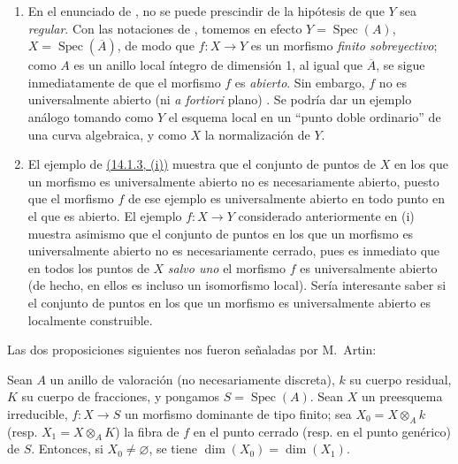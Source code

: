 \begin{remarks}[14.3.9]
\label{IV.14.3.9}
\begin{enumerate}[label=(\roman*)]
  \item En el enunciado de , no se puede prescindir de la hipótesis de que $Y$ sea \emph{regular}.
  Con las notaciones de , tomemos en efecto $Y=\operatorname{Spec}(A)$, $X=\operatorname{Spec}(\overline A)$, de modo que $f:X\to Y$ es un morfismo \emph{finito sobreyectivo}; como $A$ es un anillo local íntegro de dimensión 1, al igual que $\overline A$, se sigue inmediatamente de  que el morfismo $f$ es \emph{abierto}.
  Sin embargo, $f$ no es universalmente abierto (ni \emph{a fortiori} plano) .
  Se podría dar un ejemplo análogo tomando como $Y$ el esquema local en un ``punto doble ordinario'' de una curva algebraica, y como $X$ la normalización de $Y$.

  \item El ejemplo de {\hyperlink{ega4.c04.item.14-1-3}{(14.1.3, (i))}} muestra que el conjunto de puntos de $X$ en los que un morfismo es universalmente abierto no es necesariamente abierto, puesto que el morfismo $f$ de ese ejemplo es universalmente abierto en todo punto en el que es abierto.
  El ejemplo $f:X\to Y$ considerado anteriormente en (i) muestra asimismo que el conjunto de puntos en los que un morfismo es universalmente abierto no es necesariamente cerrado, pues es inmediato que en todos los puntos de $X$ \emph{salvo uno} el morfismo $f$ es universalmente abierto (de hecho, en ellos es incluso un isomorfismo local).
  Sería interesante saber si el conjunto de puntos en los que un morfismo es universalmente abierto es localmente construible.
\end{enumerate}
\end{remarks}

Las dos proposiciones siguientes nos fueron señaladas por M.\ Artin:

\begin{lemma}[14.3.10]
\label{IV.14.3.10}
Sean $A$ un anillo de valoración (no necesariamente discreta), $k$ su cuerpo
residual, $K$ su cuerpo de fracciones, y pongamos $S=\operatorname{Spec}(A)$. Sean
$X$ un preesquema irreducible, $f:X\to S$ un morfismo dominante de tipo finito; sea
$X_0=X\otimes_A k$ \textup{(resp.} $X_1=X\otimes_A K$\textup{)} la fibra de $f$ en el punto cerrado
\textup{(resp.} en el punto genérico\textup{)} de $S$. Entonces, si $X_0\ne\varnothing$, se tiene
$\dim(X_0)=\dim(X_1)$.
\end{lemma}

